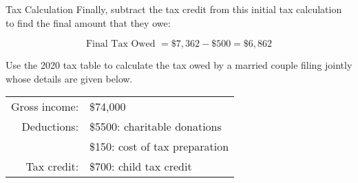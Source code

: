 \begin{example}{Tax Calculation}
Finally, subtract the tax credit from this initial tax calculation to find the final amount that they owe:

\[\textrm{Final Tax Owed } = \$7,362 - \$500 = \boxed{\$6,862}\]
\end{example}

\begin{try}
Use the 2020 tax table to calculate the tax owed by a married couple filing jointly whose details are given below.
\begin{center}
\begin{tabular}{r l}
Gross income: & \$74,000\\
Deductions: & \$5500: charitable donations\\
& \$150: cost of tax preparation\\
Tax credit: & \$700: child tax credit
\end{tabular}
\end{center}
\end{try}

